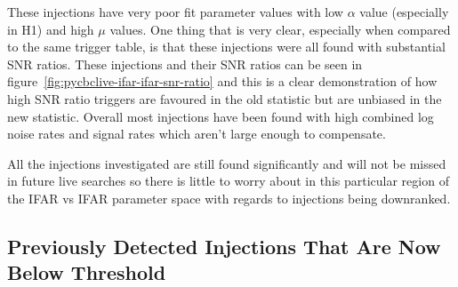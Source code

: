 %
These injections have very poor fit parameter values with low $\alpha$ value (especially in H1) and high $\mu$ values. One thing that is very clear, especially when compared to the same trigger table, is that these injections were all found with substantial SNR ratios. These injections and their SNR ratios can be seen in figure~\ref{fig:pycbclive-ifar-ifar-snr-ratio} and this is a clear demonstration of how high SNR ratio triggers are favoured in the old statistic but are unbiased in the new statistic. Overall most injections have been found with high combined log noise rates and signal rates which aren't large enough to compensate.

All the injections investigated are still found significantly and will not be missed in future live searches so there is little to worry about in this particular region of the IFAR vs IFAR parameter space with regards to injections being downranked.

\subsection{\label{sec:pycbclive-bottom-right}Previously Detected Injections That Are Now Below Threshold}

